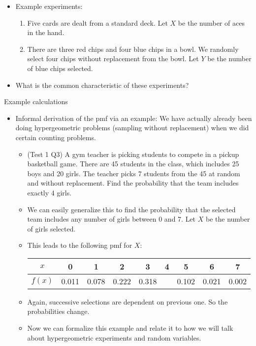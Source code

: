 \documentclass{article}
\begin{document}
\begin{itemize}
\begin{itemize}
    \end{itemize}\bigskip
    \item Example experiments:
    \begin{enumerate}
        \item Five cards are dealt from a standard deck. Let $X$ be the number of aces in the hand.
        \item There are three red chips and four blue chips in a bowl. We randomly select four chips without replacement from the bowl. Let $Y$ be the number of blue chips selected.
    \end{enumerate}
    \item What is the common characteristic of these experiments?\bigskip
\end{itemize}\bigskip

Example calculations\bigskip
\begin{itemize}
    \item Informal derivation of the pmf via an example: We have actually already been doing hypergeometric problems (sampling without replacement) when we did certain counting problems.
    \begin{itemize}
        \item (Test 1 Q3) A gym teacher is picking students to compete in a pickup basketball game. There are 45 students in the class, which includes 25 boys and 20 girls. The teacher picks 7 students from the 45 at random and without replacement. Find the probability that the team includes exactly 4 girls.\vspace{70pt}
        \item We can easily generalize this to find the probability that the selected team includes any number of girls between 0 and 7. Let $X$ be the number of girls selected. \vspace{50pt}
        \item This leads to the following pmf for $X$:\bigskip\\
        \begin{tabular}{| c || c | c | c | c | c | c | c | c |}
            \hline
            $x$ & 0 & 1 & 2 & 3 & 4 & 5 & 6 & 7\\
            \hline
            $f(x)$ & 0.011 & 0.078 & 0.222 & 0.318 & \hspace{20pt} & 0.102 & 0.021 & 0.002\\
            \hline
        \end{tabular}\bigskip
        \item Again, successive selections are dependent on previous one. So the probabilities change.\vspace{50pt}
        \item Now we can formalize this example and relate it to how we will talk about hypergeometric experiments and random variables.
    \end{itemize}
\end{itemize}\bigskip
\end{document}
